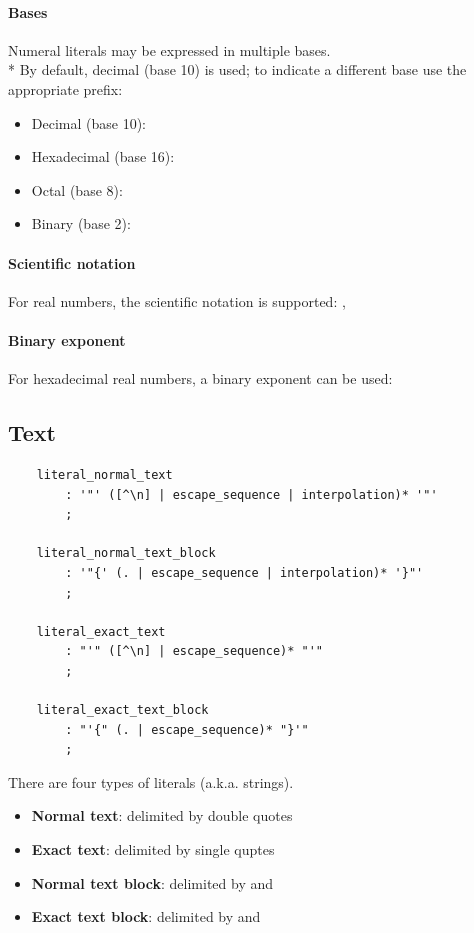 \clearpage

\paragraph{Bases} Numeral literals may be expressed in multiple bases.\\*
By default, decimal (base 10) is used; to indicate a different base use the
appropriate prefix:
\begin{itemize}
	\item Decimal (base 10): 
	\item Hexadecimal (base 16): 
	\item Octal (base 8): 
	\item Binary (base 2): 
\end{itemize}

\paragraph{Scientific notation} For real numbers, the scientific notation is
supported: , 

\paragraph{Binary exponent} For hexadecimal real numbers, a binary exponent can
be used: 


\clearpage

\subsection{Text}
\label{sec:text_syntax}

\begin{verbatim}
	literal_normal_text
		: '"' ([^\n] | escape_sequence | interpolation)* '"'
		;

	literal_normal_text_block
		: '"{' (. | escape_sequence | interpolation)* '}"'
		;

	literal_exact_text
		: "'" ([^\n] | escape_sequence)* "'"
		;

	literal_exact_text_block
		: "'{" (. | escape_sequence)* "}'"
		;
\end{verbatim}

There are four types of  literals (a.k.a. strings).

\begin{itemize}
	\item \textbf{Normal text}: delimited by double quotes 
	\item \textbf{Exact text}: delimited by single quptes 
	\item \textbf{Normal text block}: delimited by  and 
	\item \textbf{Exact text block}: delimited by  and 
\end{itemize}

